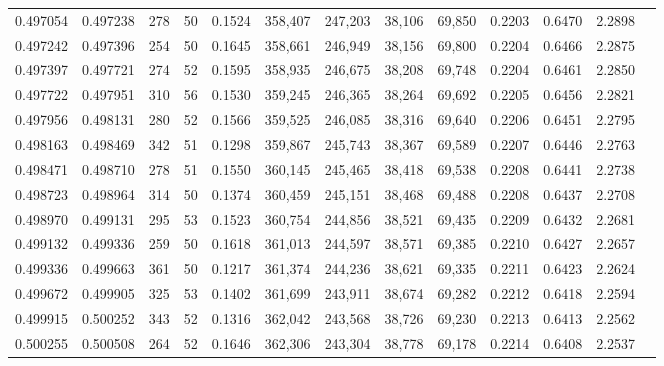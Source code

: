 \begin{tabular}{rrrrrrrrrrrrr}
0.497054 & 0.497238 &   278 &  50 &                                     0.1524 & 358,407 & 247,203 &  38,106 &  69,850 & 0.2203 & 0.6470 & 2.2898 \\
0.497242 & 0.497396 &   254 &  50 &                                     0.1645 & 358,661 & 246,949 &  38,156 &  69,800 & 0.2204 & 0.6466 & 2.2875 \\
0.497397 & 0.497721 &   274 &  52 &                                     0.1595 & 358,935 & 246,675 &  38,208 &  69,748 & 0.2204 & 0.6461 & 2.2850 \\
0.497722 & 0.497951 &   310 &  56 &                                     0.1530 & 359,245 & 246,365 &  38,264 &  69,692 & 0.2205 & 0.6456 & 2.2821 \\
0.497956 & 0.498131 &   280 &  52 &                                     0.1566 & 359,525 & 246,085 &  38,316 &  69,640 & 0.2206 & 0.6451 & 2.2795 \\
0.498163 & 0.498469 &   342 &  51 &                                     0.1298 & 359,867 & 245,743 &  38,367 &  69,589 & 0.2207 & 0.6446 & 2.2763 \\
0.498471 & 0.498710 &   278 &  51 &                                     0.1550 & 360,145 & 245,465 &  38,418 &  69,538 & 0.2208 & 0.6441 & 2.2738 \\
0.498723 & 0.498964 &   314 &  50 &                                     0.1374 & 360,459 & 245,151 &  38,468 &  69,488 & 0.2208 & 0.6437 & 2.2708 \\
0.498970 & 0.499131 &   295 &  53 &                                     0.1523 & 360,754 & 244,856 &  38,521 &  69,435 & 0.2209 & 0.6432 & 2.2681 \\
0.499132 & 0.499336 &   259 &  50 &                                     0.1618 & 361,013 & 244,597 &  38,571 &  69,385 & 0.2210 & 0.6427 & 2.2657 \\
0.499336 & 0.499663 &   361 &  50 &                                     0.1217 & 361,374 & 244,236 &  38,621 &  69,335 & 0.2211 & 0.6423 & 2.2624 \\
0.499672 & 0.499905 &   325 &  53 &                                     0.1402 & 361,699 & 243,911 &  38,674 &  69,282 & 0.2212 & 0.6418 & 2.2594 \\
0.499915 & 0.500252 &   343 &  52 &                                     0.1316 & 362,042 & 243,568 &  38,726 &  69,230 & 0.2213 & 0.6413 & 2.2562 \\
0.500255 & 0.500508 &   264 &  52 &                                     0.1646 & 362,306 & 243,304 &  38,778 &  69,178 & 0.2214 & 0.6408 & 2.2537 \\

\end{tabular}
